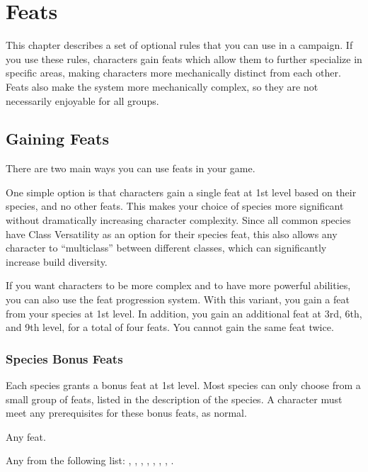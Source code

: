 \chapter{Feats}\label{Feats}

This chapter describes a set of optional rules that you can use in a campaign.
If you use these rules, characters gain feats which allow them to further specialize in specific areas, making characters more mechanically distinct from each other.
Feats also make the system more mechanically complex, so they are not necessarily enjoyable for all groups.

\section{Gaining Feats}
    There are two main ways you can use feats in your game.

    One simple option is that characters gain a single feat at 1st level based on their species, and no other feats.
    This makes your choice of species more significant without dramatically increasing character complexity.
    Since all common species have Class Versatility as an option for their species feat,
        this also allows any character to ``multiclass'' between different classes, which can significantly increase build diversity.

    If you want characters to be more complex and to have more powerful abilities, you can also use the feat progression system.
    With this variant, you gain a feat from your species at 1st level.
    In addition, you gain an additional feat at 3rd, 6th, and 9th level, for a total of four feats.
    You cannot gain the same feat twice.

    \subsection{Species Bonus Feats}\label{Species Bonus Feats}
        Each species grants a bonus feat at 1st level. Most species can only choose from a small group of feats, listed in the description of the species. A character must meet any prerequisites for these bonus feats, as normal.

         Any feat.

         Any from the following list: , , , , , , , .

